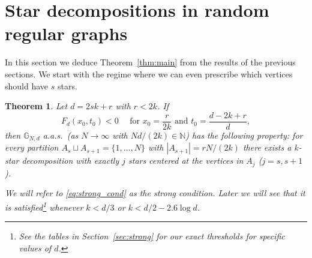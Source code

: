 \documentclass[12pt]{amsart}
\newtheorem{theorem}{Theorem}[section]
\theoremstyle{definition}
\newcommand\Nb{\mathbb{N}}
\newcommand\Gb{\mathbb{G}}
\begin{document}
\section{Star decompositions in random regular graphs}
\label{sec:sd_in_rrg}

In this section we deduce Theorem~\ref{thm:main} from the results of the previous sections. We start with the regime where we can even prescribe which vertices should have $s$ stars.
%
\begin{theorem} \label{thm:strong_cond}
Let $d=2sk+r$ with $r<2k$. If 
%
\begin{equation} \label{eq:strong_cond}
F_d( x_0,t_0 ) < 0 
\quad \text{ for } 
x_0=\frac{r}{2k} \text{ and }
t_0=  \frac{d-2k+r}{d},
\end{equation}
%
then $\Gb_{N,d}$ a.a.s.~(as $N \to \infty$ with $Nd/(2k) \in \Nb$) has the following property: for every partition $A_s \sqcup A_{s+1}=\{1,\ldots,N\}$ with $|A_{s+1}|=rN/(2k)$ there exists a $k$-star decomposition with exactly $j$ stars centered at the vertices in $A_j$ ($j=s,s+1$).

We will refer to \eqref{eq:strong_cond} as the \emph{strong condition}. Later we will see that it is satisfied\footnote{See the tables in Section~\ref{sec:strong} for our exact thresholds for specific values of $d$.} whenever $k<d/3$ or $k<d/2-2.6 \log d$.
\end{theorem}
%
\end{document}

